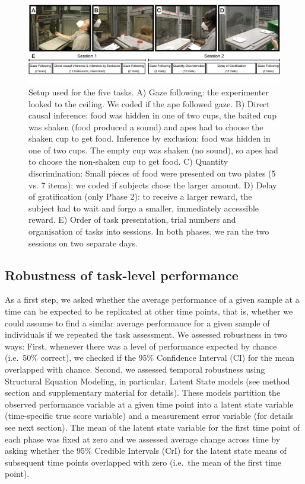 \documentclass[
  man,floatsintext]{apa6}
\begin{document}
\begin{figure}
\includegraphics[width=1\linewidth]{./figures/setup} \caption{Setup used for the five tasks. A) Gaze following: the experimenter looked to the ceiling. We coded if the ape followed gaze. B) Direct causal inference: food was hidden in one of two cups, the baited cup was shaken (food produced a sound) and apes had to choose the shaken cup to get food. Inference by exclusion: food was hidden in one of two cups. The empty cup was shaken (no sound), so apes had to choose the non-shaken cup to get food. C) Quantity discrimination: Small pieces of food were presented on two plates (5 vs. 7 items); we coded if subjects chose the larger amount. D) Delay of gratification (only Phase 2): to receive a larger reward, the subject had to wait and forgo a smaller, immediately accessible reward. E) Order of task presentation, trial numbers and organisation of tasks into sessions. In both phases, we ran the two sessions on two separate days.}\label{fig:setup}
\end{figure}

\hypertarget{robustness-of-task-level-performance}{%
\subsection{Robustness of task-level performance}\label{robustness-of-task-level-performance}}

As a first step, we asked whether the average performance of a given sample at a time can be expected to be replicated at other time points, that is, whether we could assume to find a similar average performance for a given sample of individuals if we repeated the task assessment. We assessed robustness in two ways: First, whenever there was a level of performance expected by chance (i.e.~50\% correct), we checked if the 95\% Confidence Interval (CI) for the mean overlapped with chance. Second, we assessed temporal robustness using Structural Equation Modeling, in particular, Latent State models (see method section and supplementary material for details). These models partition the observed performance variable at a given time point into a latent state variable (time-specific true score variable) and a measurement error variable (for details see next section). The mean of the latent state variable for the first time point of each phase was fixed at zero and we assessed average change across time by asking whether the 95\% Credible Intervals (CrI) for the latent state means of subsequent time points overlapped with zero (i.e.~the mean of the first time point).
\end{document}
